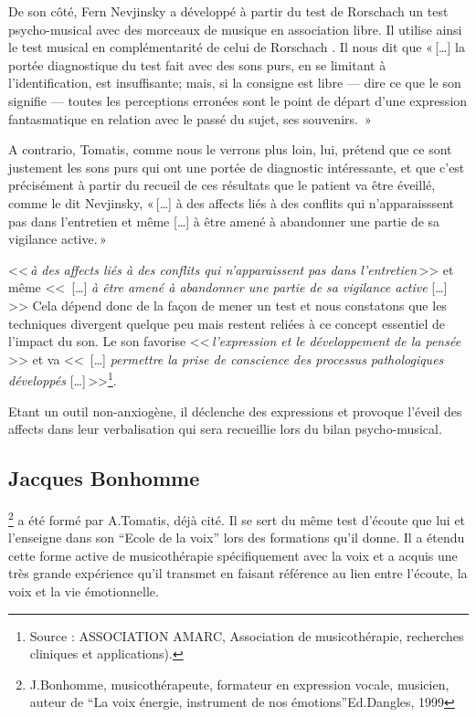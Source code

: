  De son côté, Fern Nevjinsky a développé à partir du  test de Rorschach un test psycho-musical avec des morceaux
de musique en association libre. Il utilise ainsi le test
musical en complémentarité de celui de Rorschach%
\autocite[Fern Nevjinsky, maître de conférences à l'Université de Rouen, musicien, psycho-analyste. 
``\textit{Comparaison des modalités de projection et d'expression au test de Rorschach et à un test psycho-musical pour des adolescents de 13 à 16 ans}''.]{nevjinsky:adolescence}.  
Il nous dit  que  «\,[\ldots] la
portée diagnostique du test fait avec des sons purs, en se limitant à
l'identification, est insuffisante; mais, si la consigne est libre ---
dire ce que le son signifie --- toutes les perceptions erronées sont
le point de départ d'une expression fantasmatique en relation avec le
passé du sujet, ses souvenirs. \,» 

A contrario, Tomatis, comme nous le verrons plus loin, lui, prétend que ce sont justement les sons purs
qui ont une portée de diagnostic intéressante, et que c'est précisément à
partir du recueil de ces résultats que le patient va être éveillé,
comme le dit Nevjinsky, «\,[\ldots] à des
affects liés à des conflits qui n'apparaisssent pas dans l'entretien
et même [\ldots] à être amené à abandonner une partie de sa vigilance active.\,»

 <<\,\emph{à des affects liés à des conflits qui n'apparaissent pas
   dans l'entretien}\,>> et même <<\, [\ldots] \emph{ à être amené à abandonner une partie de sa vigilance active} [\ldots]\,>>
Cela dépend donc de la façon
de mener un test et 
nous constatons que les techniques divergent quelque peu mais restent
reliées à ce  concept essentiel de l'impact du son.
Le son favorise  <<\,\emph{l'expression et le développement
	de la pensée}\,>> et  va <<\, [\ldots] \emph{permettre la prise de conscience des processus pathologiques développés} [\ldots]\,>>\footnote{Source : ASSOCIATION AMARC,
  Association de musicothérapie, recherches cliniques et
  applications). }.

Etant  un outil non-anxiogène, il déclenche des expressions et provoque
l'éveil des affects dans  leur verbalisation qui sera recueillie lors
du bilan psycho-musical.
 
  \subsection{Jacques Bonhomme} \footnote{J.Bonhomme, musicothérapeute, formateur 
  	en expression vocale, musicien, auteur de ``La voix énergie,
        instrument de nos émotions''Ed.Dangles, 1999}  a 
      été formé par A.Tomatis, déjà cité. Il se sert du même test d'écoute
      que lui et l'enseigne dans son ``Ecole de la voix'' lors des
      formations qu'il donne. Il a étendu cette  forme active de musicothérapie
      spécifiquement avec la voix 
     et a acquis une
      très grande expérience qu'il transmet en   
      faisant référence au lien entre l'écoute, la voix et la vie émotionnelle.

